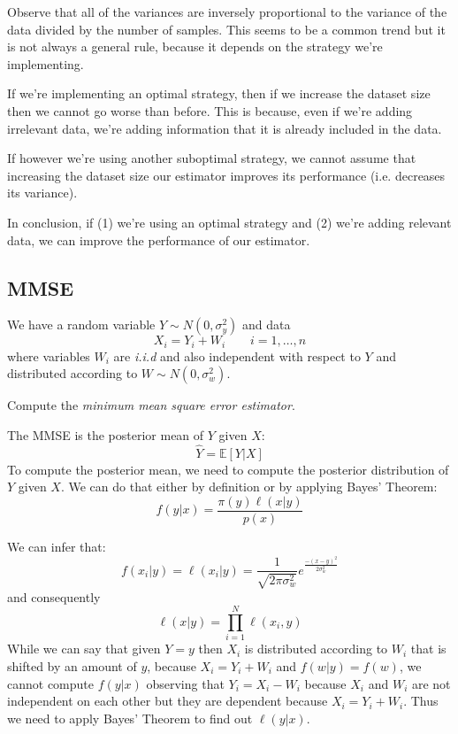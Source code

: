 \begin{remark}
    Observe that all of the variances are inversely proportional to the variance of the data divided by the number of samples. This seems to be a common trend but it is not always a general rule, because it depends on the strategy we're implementing.

    If we're implementing an optimal strategy, then if we increase the dataset size then we cannot go worse than before. This is because, even if we're adding irrelevant data, we're adding information that it is already included in the data.

    If however we're using another suboptimal strategy, we cannot assume that increasing the dataset size our estimator improves its performance (i.e. decreases its variance).

    In conclusion, if (1) we're using an optimal strategy and (2) we're adding relevant data, we can improve the performance of our estimator.
\end{remark}
\subsection{MMSE}
\begin{exercise}
    We have a random variable $Y \sim N(0, \sigma^2_y)$ and data
    \[
        X_i = Y_i + W_i \qquad i = 1, \dots, n
    \]
    where variables $W_i$ are \textit{i.i.d} and also independent with respect to $Y$ and distributed according to $W \sim N(0, \sigma_w^2)$.

    Compute the \textit{minimum mean square error estimator}.
\end{exercise}

The MMSE is the posterior mean of $Y$ given $X$:
\[
    \hat{Y} = \mathbb{E}\left[ Y | X\right]
\]
To compute the posterior mean, we need to compute the posterior distribution of $Y$ given $X$. We can do that either by definition or by applying Bayes' Theorem:
\[
    f(y|x) = \frac{\pi(y) \ell(x|y)}{p(x)}
\]


We can infer that:
\[
    f(x_i|y) = \ell(x_i|y) = \frac{1}{\sqrt{2\pi \sigma^2_w}} e^{\frac{-(x-y)^2}{2\sigma_w^2}}
\]
and consequently
\[
    \ell(x|y) = \prod_{i = 1}^{N} \ell(x_i, y)
\]
While we can say that given $Y=y$ then $X_i$ is distributed according to $W_i$ that is shifted by an amount of $y$, because $X_i = Y_i + W_i$ and $f(w|y) = f(w)$, we cannot compute $f(y|x)$ observing that $Y_i = X_i - W_i$ because $X_i$ and $W_i$ are not independent on each other but they are dependent because $X_i = Y_i + W_i$. Thus we need to apply Bayes' Theorem to find out $\ell(y|x)$.

